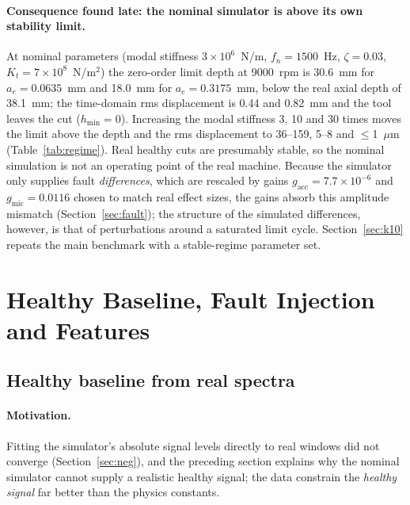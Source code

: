 \documentclass[11pt]{article}
\begin{document}
\paragraph{Consequence found late: the nominal simulator is above its own stability limit.} At nominal parameters (modal stiffness $3\times10^{6}$~N/m, $f_n{=}1500$~Hz, $\zeta{=}0.03$, $K_t{=}7\times10^{8}$~N/m$^2$) the zero-order limit depth at 9000~rpm is 30.6~mm for $a_e{=}0.0635$~mm and 18.0~mm for $a_e{=}0.3175$~mm, below the real axial depth of 38.1~mm; the time-domain rms displacement is 0.44 and 0.82~mm and the tool leaves the cut ($h_{\min}=0$). Increasing the modal stiffness 3, 10 and 30 times moves the limit above the depth and the rms displacement to 36--159, 5--8 and $\le$1~$\mu$m (Table~\ref{tab:regime}). Real healthy cuts are presumably stable, so the nominal simulation is not an operating point of the real machine. Because the simulator only supplies fault \emph{differences}, which are rescaled by gains $g_\text{acc}=7.7\times10^{-6}$ and $g_\text{mic}=0.0116$ chosen to match real effect sizes, the gains absorb this amplitude mismatch (Section~\ref{sec:fault}); the structure of the simulated differences, however, is that of perturbations around a saturated limit cycle. Section~\ref{sec:k10} repeats the main benchmark with a stable-regime parameter set.
\begin{table}[t]\centering\small
\caption{Operating regime of the simulator at 9000~rpm, $a_p=38.1$~mm, as a function of the modal stiffness scale (nominal $=1$). Source: \texttt{regime\_check.py}.}\label{tab:regime}

\end{table}

\section{Healthy Baseline, Fault Injection and Features}
\subsection{Healthy baseline from real spectra}\label{sec:base}
\paragraph{Motivation.} Fitting the simulator's absolute signal levels directly to real windows did not converge (Section~\ref{sec:neg}), and the preceding section explains why the nominal simulator cannot supply a realistic healthy signal; the data constrain the \emph{healthy signal} far better than the physics constants.
\end{document}
